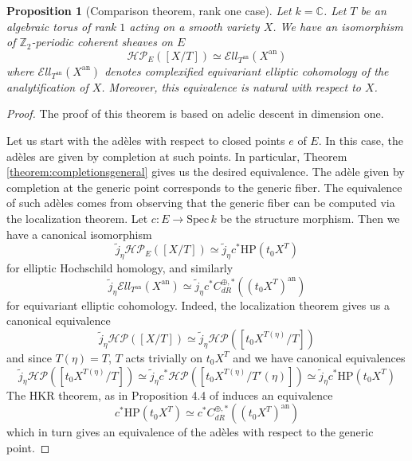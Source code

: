 \documentclass[11pt,letterpaper]{amsart}
\newtheorem{proposition}[dummy]{Proposition}
\newcommand{\mHP}{\mathrm{HP}}
\newcommand{\bC}{\mathbb{C}}
\newcommand{\bZ}{\mathbb{Z}}
\newcommand{\cHP}{\mathcal{HP}}
\newcommand{\Spec}{\mathrm{S}\mathrm{pec}\,}
\newcommand{\El}{\mathcal{E}ll}
\newcommand{\an}{\mathrm{an}}
\begin{document}
\begin{proposition}[Comparison theorem, rank one case]\label{prop:Comparisonrk1}
Let $k=\bC$. Let $T$ be an algebraic torus of rank $1$ acting on a smooth variety $X$.
We have an isomorphism of $\bZ_2$-periodic coherent sheaves on $E$
$$\cHP_E([X/T])\simeq\El_{T^{\an}}(X^{\an})$$
where $\El_{T^{\an}}(X^{\an})$ denotes complexified equivariant elliptic cohomology  of the analytification of $X$. Moreover, this equivalence is natural with respect to $X$.
\end{proposition}
\begin{proof}
The proof of this theorem is based on adelic descent in dimension one. 

Let us start with the ad\`eles with respect to closed points $e$ of $E$. In this case, the ad\`eles are given by completion at such points. In particular, Theorem \ref{theorem:completionsgeneral} gives us the desired equivalence. The ad\`ele given by completion at the generic point corresponds to the generic fiber. The equivalence of such ad\`eles comes from observing that the generic fiber can be computed via the localization theorem. Let $c:E\to\Spec k$ be the structure morphism. Then we have a canonical isomorphism
$$\tilde{j}_{\eta}\cHP_{E}([X/T])\simeq \tilde{j}_{\eta}c^{\ast}\mHP(t_0 X^{T})$$
for elliptic Hochschild homology, and similarly 
$$\tilde{j}_{\eta}\El_{T^{\an}}(X^{\an})\simeq \tilde{j}_{\eta}c^{\ast}C_{dR}^{\oplus,\ast}((t_0 X^{T})^{\an})$$
for equivariant elliptic cohomology. Indeed, the localization theorem gives us a canonical equivalence
$$\tilde{j}_{\eta}\cHP([X/T])\simeq\tilde{j}_{\eta}\cHP([t_0X^{T(\eta)}/T])$$
and since $T(\eta)=T$, $T$ acts trivially on $t_0 X^T$ and we have canonical equivalences
$$\tilde{j}_{\eta}\cHP([t_0X^{T(\eta)}/T])\simeq\tilde{j}_{\eta}c^\ast\cHP([t_0X^{T(\eta)}/T'(\eta)])\simeq\tilde{j}_{\eta}c^{\ast}\mHP(t_0 X^{T})$$
The HKR theorem, as in Proposition 4.4 of \cite{BZNLoopConn} induces an equivalence
$$c^{\ast}\mHP(t_0 X^{T})\simeq c^{\ast}C_{dR}^{\oplus,\ast}((t_0 X^{T})^{\an})$$
which in turn gives an equivalence of the ad\`eles with respect to the generic point. 


\end{proof}
\end{document}
